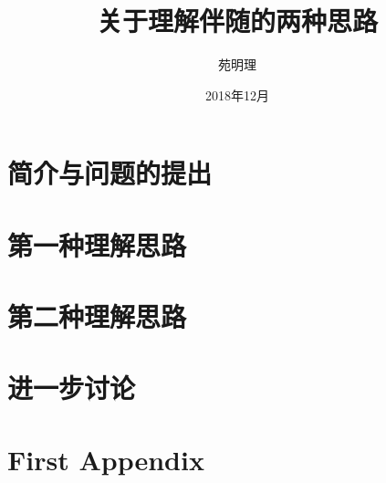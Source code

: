 \documentclass[a4paper,12pt]{article}
\title{关于理解伴随的两种思路}
\author{苑明理}
\date{2018年12月}
\begin{document}
\maketitle{}

\renewcommand\contentsname{目录}
\setcounter{tocdepth}{2}
\tableofcontents

\newpage

\section{简介与问题的提出}

\section{第一种理解思路}

\section{第二种理解思路}

\section{进一步讨论}

\appendix
\section{First Appendix}
\end{document}

